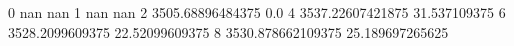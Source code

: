 0 nan nan
1 nan nan
2 3505.68896484375 0.0
4 3537.22607421875 31.537109375
6 3528.2099609375 22.52099609375
8 3530.878662109375 25.189697265625
